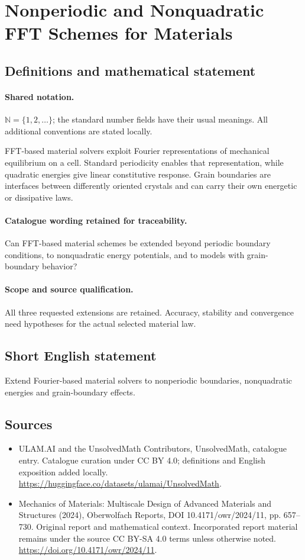 \documentclass[11pt]{article}
\begin{document}
\section{Nonperiodic and Nonquadratic FFT Schemes for Materials}\label{statement}

\subsection{Definitions and mathematical statement}

\paragraph{Shared notation.}$\mathbb N=\{1,2,\ldots\}$; the standard number fields have their usual meanings. All additional conventions are stated locally.


FFT-based material solvers exploit Fourier representations of mechanical equilibrium on a cell. Standard periodicity enables that representation, while quadratic energies give linear constitutive response. Grain boundaries are interfaces between differently oriented crystals and can carry their own energetic or dissipative laws.

\paragraph{Catalogue wording retained for traceability.}
Can FFT-based material schemes be extended beyond periodic boundary conditions, to nonquadratic energy potentials, and to models with grain-boundary behavior?

\paragraph{Scope and source qualification.}All three requested extensions are retained. Accuracy, stability and convergence need hypotheses for the actual selected material law.
\subsection{Short English statement}
Extend Fourier-based material solvers to nonperiodic boundaries, nonquadratic energies and grain-boundary effects.
\subsection{Sources}
\begin{itemize}
\item[\hypertarget{source:statement:1}{S1}] ULAM.AI and the UnsolvedMath Contributors, UnsolvedMath, catalogue entry. Catalogue curation under CC BY 4.0; definitions and English exposition added locally.
\url{https://huggingface.co/datasets/ulamai/UnsolvedMath}.
\item[\hypertarget{source:statement:2}{S2}] Mechanics of Materials: Multiscale Design of Advanced Materials and Structures (2024), Oberwolfach Reports, DOI 10.4171/owr/2024/11, pp. 657--730. Original report and mathematical context. Incorporated report material remains under the source CC BY-SA 4.0 terms unless otherwise noted.
\url{https://doi.org/10.4171/owr/2024/11}.
\end{itemize}
\label{end:statement}
\end{document}
